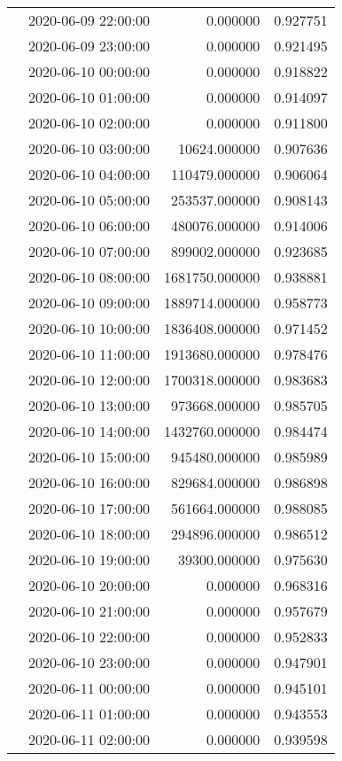 \begin{tabular}{llrr}
 & 2020-06-09 22:00:00 & 0.000000 & 0.927751 \\
 & 2020-06-09 23:00:00 & 0.000000 & 0.921495 \\
 & 2020-06-10 00:00:00 & 0.000000 & 0.918822 \\
 & 2020-06-10 01:00:00 & 0.000000 & 0.914097 \\
 & 2020-06-10 02:00:00 & 0.000000 & 0.911800 \\
 & 2020-06-10 03:00:00 & 10624.000000 & 0.907636 \\
 & 2020-06-10 04:00:00 & 110479.000000 & 0.906064 \\
 & 2020-06-10 05:00:00 & 253537.000000 & 0.908143 \\
 & 2020-06-10 06:00:00 & 480076.000000 & 0.914006 \\
 & 2020-06-10 07:00:00 & 899002.000000 & 0.923685 \\
 & 2020-06-10 08:00:00 & 1681750.000000 & 0.938881 \\
 & 2020-06-10 09:00:00 & 1889714.000000 & 0.958773 \\
 & 2020-06-10 10:00:00 & 1836408.000000 & 0.971452 \\
 & 2020-06-10 11:00:00 & 1913680.000000 & 0.978476 \\
 & 2020-06-10 12:00:00 & 1700318.000000 & 0.983683 \\
 & 2020-06-10 13:00:00 & 973668.000000 & 0.985705 \\
 & 2020-06-10 14:00:00 & 1432760.000000 & 0.984474 \\
 & 2020-06-10 15:00:00 & 945480.000000 & 0.985989 \\
 & 2020-06-10 16:00:00 & 829684.000000 & 0.986898 \\
 & 2020-06-10 17:00:00 & 561664.000000 & 0.988085 \\
 & 2020-06-10 18:00:00 & 294896.000000 & 0.986512 \\
 & 2020-06-10 19:00:00 & 39300.000000 & 0.975630 \\
 & 2020-06-10 20:00:00 & 0.000000 & 0.968316 \\
 & 2020-06-10 21:00:00 & 0.000000 & 0.957679 \\
 & 2020-06-10 22:00:00 & 0.000000 & 0.952833 \\
 & 2020-06-10 23:00:00 & 0.000000 & 0.947901 \\
 & 2020-06-11 00:00:00 & 0.000000 & 0.945101 \\
 & 2020-06-11 01:00:00 & 0.000000 & 0.943553 \\
 & 2020-06-11 02:00:00 & 0.000000 & 0.939598 \\

\end{tabular}
